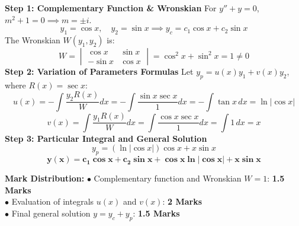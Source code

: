 \begin{solutionbox}
\textbf{Step 1: Complementary Function \& Wronskian}
For $y'' + y = 0$, $m^2 + 1 = 0 \implies m = \pm i$.
\[
y_1 = \cos x, \quad y_2 = \sin x \implies y_c = c_1 \cos x + c_2 \sin x
\]
The Wronskian $W(y_1, y_2)$ is:
\[
W = \begin{vmatrix} \cos x & \sin x \\ -\sin x & \cos x \end{vmatrix} = \cos^2 x + \sin^2 x = 1 \neq 0
\]
\textbf{Step 2: Variation of Parameters Formulas}
Let $y_p = u(x)y_1 + v(x)y_2$, where $R(x) = \sec x$:
\[
u(x) = -\int \frac{y_2 R(x)}{W} dx = -\int \frac{\sin x \sec x}{1} dx = -\int \tan x \, dx = \ln |\cos x|
\]
\[
v(x) = \int \frac{y_1 R(x)}{W} dx = \int \frac{\cos x \sec x}{1} dx = \int 1 \, dx = x
\]
\textbf{Step 3: Particular Integral and General Solution}
\[
y_p = (\ln |\cos x|)\cos x + x \sin x
\]
\[
\mathbf{y(x) = c_1 \cos x + c_2 \sin x + \cos x \ln |\cos x| + x \sin x}
\]

\begin{markingrubric}
\textbf{Mark Distribution:}
$\bullet$ Complementary function and Wronskian $W=1$: \textbf{1.5 Marks}\\
$\bullet$ Evaluation of integrals $u(x)$ and $v(x)$: \textbf{2 Marks}\\
$\bullet$ Final general solution $y = y_c + y_p$: \textbf{1.5 Marks}
\end{markingrubric}
\end{solutionbox}

